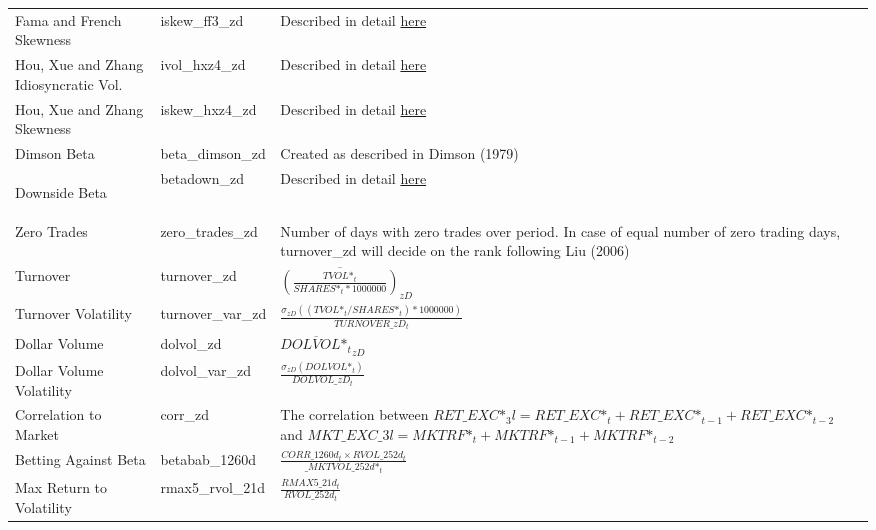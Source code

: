 \documentclass[12pt,title,fleqn]{article}
\begin{document}
{\begin{longtable}{@{\extracolsep{\fill}}|m{5cm}|l|m{8cm}|@{}}
    Fama and French Skewness & iskew\_ff3\_zd & Described in detail \hyperlink{factors}{here} \\   
    
    Hou, Xue and Zhang Idiosyncratic Vol. & ivol\_hxz4\_zd & Described in detail \hyperlink{factors}{here}\\ 
     
    Hou, Xue and Zhang Skewness & iskew\_hxz4\_zd & Described in detail \hyperlink{factors}{here} \\    
    
    Dimson Beta & beta\_dimson\_zd & Created as described in Dimson (1979) \\
    
    \hypertarget{dbeta2}{Downside Beta} & betadown\_zd & Described in detail \hyperlink{dbeta}{here} \\
    
	Zero Trades & zero\_trades\_zd & Number of days with zero trades over period. In case of equal number of zero trading days, turnover\_zd will decide on the rank following Liu (2006) \\
    
    Turnover & turnover\_zd &$\overline{\left(\frac{TVOL\mbox{*}_t}{SHARES\mbox{*}_t*1000000}\right)}_{zD}$\\
    
    Turnover Volatility & turnover\_var\_zd & $\frac{\sigma_{zD}\left((TVOL\mbox{*}_t/SHARES\mbox{*}_t)*1000000\right)}{TURNOVER\_zD_t}$\\
    
    Dollar Volume & dolvol\_zd &$\overline{DOLVOL\mbox{*}_t}_{zD}$\\
    
    Dollar Volume Volatility & dolvol\_var\_zd & $\frac{\sigma_{zD}(DOLVOL\mbox{*}_t)}{DOLVOL\_zD_t}$ \\
    
    Correlation to Market & corr\_zd & The correlation between $RET\_EXC\mbox{*}_3l = RET\_EXC\mbox{*}_t + RET\_EXC\mbox{*}_{t-1} + RET\_EXC\mbox{*}_{t-2}$ and $MKT\_EXC\_3l = MKTRF\mbox{*}_t + MKTRF\mbox{*}_{t-1} + MKTRF\mbox{*}_{t-2}$ \\
    
    Betting Against Beta & betabab\_1260d & $\frac{CORR\_1260d_t \times RVOL\_252d_t}{\_MKTVOL\_252d\mbox{*}_t}$ \\
    
    Max Return to Volatility & rmax5\_rvol\_21d &$\frac{RMAX5\_21d_t}{RVOL\_252d_t}$ \\
    

\end{longtable}}
\end{document}
